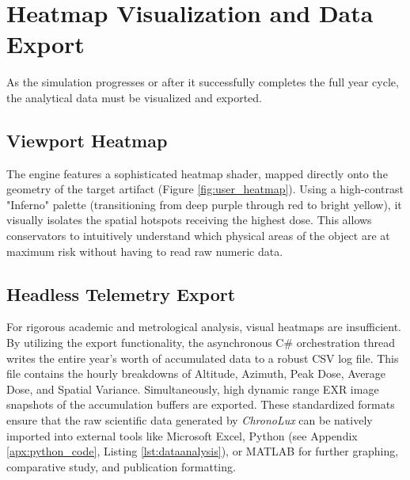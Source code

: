 \section{Heatmap Visualization and Data Export}

As the simulation progresses or after it successfully completes the full year cycle, the analytical data must be visualized and exported.

\subsection{Viewport Heatmap}
The engine features a sophisticated heatmap shader, mapped directly onto the geometry of the target artifact (Figure \ref{fig:user_heatmap}). Using a high-contrast "Inferno" palette (transitioning from deep purple through red to bright yellow), it visually isolates the spatial hotspots receiving the highest dose. This allows conservators to intuitively understand which physical areas of the object are at maximum risk without having to read raw numeric data.

\subsection{Headless Telemetry Export}
For rigorous academic and metrological analysis, visual heatmaps are insufficient. By utilizing the export functionality, the asynchronous C\# orchestration thread writes the entire year's worth of accumulated data to a robust CSV log file. This file contains the hourly breakdowns of Altitude, Azimuth, Peak Dose, Average Dose, and Spatial Variance. Simultaneously, high dynamic range EXR image snapshots of the accumulation buffers are exported. These standardized formats ensure that the raw scientific data generated by \textit{ChronoLux} can be natively imported into external tools like Microsoft Excel, Python (see Appendix \ref{apx:python_code}, Listing \ref{lst:dataanalysis}), or MATLAB for further graphing, comparative study, and publication formatting.
